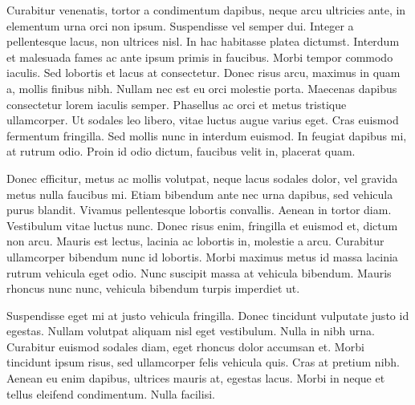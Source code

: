 Curabitur venenatis, tortor a condimentum dapibus, neque arcu ultricies ante, in elementum urna orci non ipsum. Suspendisse vel semper dui. Integer a pellentesque lacus, non ultrices nisl. In hac habitasse platea dictumst. Interdum et malesuada fames ac ante ipsum primis in faucibus. Morbi tempor commodo iaculis. Sed lobortis et lacus at consectetur. Donec risus arcu, maximus in quam a, mollis finibus nibh. Nullam nec est eu orci molestie porta. Maecenas dapibus consectetur lorem iaculis semper. Phasellus ac orci et metus tristique ullamcorper. Ut sodales leo libero, vitae luctus augue varius eget. Cras euismod fermentum fringilla. Sed mollis nunc in interdum euismod. In feugiat dapibus mi, at rutrum odio. Proin id odio dictum, faucibus velit in, placerat quam.

Donec efficitur, metus ac mollis volutpat, neque lacus sodales dolor, vel gravida metus nulla faucibus mi. Etiam bibendum ante nec urna dapibus, sed vehicula purus blandit. Vivamus pellentesque lobortis convallis. Aenean in tortor diam. Vestibulum vitae luctus nunc. Donec risus enim, fringilla et euismod et, dictum non arcu. Mauris est lectus, lacinia ac lobortis in, molestie a arcu. Curabitur ullamcorper bibendum nunc id lobortis. Morbi maximus metus id massa lacinia rutrum vehicula eget odio. Nunc suscipit massa at vehicula bibendum. Mauris rhoncus nunc nunc, vehicula bibendum turpis imperdiet ut.

Suspendisse eget mi at justo vehicula fringilla. Donec tincidunt vulputate justo id egestas. Nullam volutpat aliquam nisl eget vestibulum. Nulla in nibh urna. Curabitur euismod sodales diam, eget rhoncus dolor accumsan et. Morbi tincidunt ipsum risus, sed ullamcorper felis vehicula quis. Cras at pretium nibh. Aenean eu enim dapibus, ultrices mauris at, egestas lacus. Morbi in neque et tellus eleifend condimentum. Nulla facilisi. 

\bye
